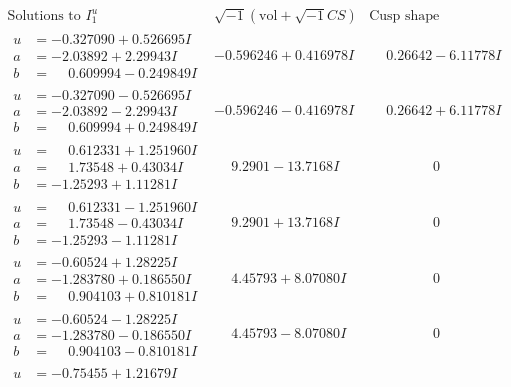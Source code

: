 \documentclass[1p]{elsarticle_modified}
\theoremstyle{definition}
\newcommand{\I}{\sqrt{-1}}
\begin{document}
$$\begin{array}{c|c|c}
\text{Solutions to }I^u_{1}& \I (\text{vol} + \sqrt{-1}CS) & \text{Cusp shape}\\
 \hline 
\begin{aligned}
u &= -0.327090 + 0.526695 I \\
a &= -2.03892 + 2.29943 I \\
b &= \phantom{-}0.609994 - 0.249849 I\end{aligned}
 & -0.596246 + 0.416978 I & \phantom{-}0.26642 - 6.11778 I \\ \hline\begin{aligned}
u &= -0.327090 - 0.526695 I \\
a &= -2.03892 - 2.29943 I \\
b &= \phantom{-}0.609994 + 0.249849 I\end{aligned}
 & -0.596246 - 0.416978 I & \phantom{-}0.26642 + 6.11778 I \\ \hline\begin{aligned}
u &= \phantom{-}0.612331 + 1.251960 I \\
a &= \phantom{-}1.73548 + 0.43034 I \\
b &= -1.25293 + 1.11281 I\end{aligned}
 & \phantom{-}9.2901 - 13.7168 I & \phantom{-0.000000 } 0 \\ \hline\begin{aligned}
u &= \phantom{-}0.612331 - 1.251960 I \\
a &= \phantom{-}1.73548 - 0.43034 I \\
b &= -1.25293 - 1.11281 I\end{aligned}
 & \phantom{-}9.2901 + 13.7168 I & \phantom{-0.000000 } 0 \\ \hline\begin{aligned}
u &= -0.60524 + 1.28225 I \\
a &= -1.283780 + 0.186550 I \\
b &= \phantom{-}0.904103 + 0.810181 I\end{aligned}
 & \phantom{-}4.45793 + 8.07080 I & \phantom{-0.000000 } 0 \\ \hline\begin{aligned}
u &= -0.60524 - 1.28225 I \\
a &= -1.283780 - 0.186550 I \\
b &= \phantom{-}0.904103 - 0.810181 I\end{aligned}
 & \phantom{-}4.45793 - 8.07080 I & \phantom{-0.000000 } 0 \\ \hline\begin{aligned}
u &= -0.75455 + 1.21679 I \\

\end{aligned}
\end{array}$$
\end{document}
